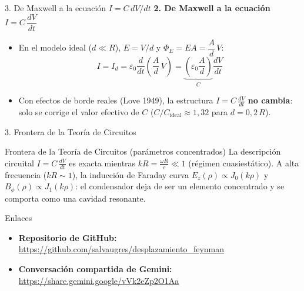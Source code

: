 \documentclass[aspectratio=43, 11pt]{beamer}
\begin{document}
\begin{frame}{3. De Maxwell a la ecuación $I = C\,dV/dt$}
      \textbf{\color{accentblue}2. De Maxwell a la ecuación $I = C\,\dfrac{dV}{dt}$}
      \vspace{0.15cm}
      \begin{itemize}
        \item En el modelo ideal ($d \ll R$), $E = V/d$ y $\Phi_E = E A = \dfrac{A}{d}\,V$:
        \[
          I = I_d = \varepsilon_0 \frac{d}{dt}\!\left(\frac{A}{d}\,V\right) = \underbrace{\left(\varepsilon_0 \frac{A}{d}\right)}_{C} \frac{dV}{dt}
        \]
        \item Con efectos de borde reales (Love 1949), la estructura $I = C\,\frac{dV}{dt}$ \textbf{no cambia}: solo se corrige el valor efectivo de $C$ ($C/C_{\mathrm{ideal}} \approx 1{,}32$ para $d = 0{,}2\,R$).
      \end{itemize}
\end{frame}

\begin{frame}{3. Frontera de la Teoría de Circuitos}
  \begin{block}{Frontera de la Teoría de Circuitos (parámetros concentrados)}
    La descripción circuital $I = C\,\frac{dV}{dt}$ es exacta mientras $kR = \frac{\omega R}{c} \ll 1$ (régimen cuasiestático). A alta frecuencia ($kR \sim 1$), la inducción de Faraday curva $E_z(\rho) \propto J_0(k\rho)$ y $B_\phi(\rho) \propto J_1(k\rho)$: el condensador deja de ser un elemento concentrado y se comporta como una cavidad resonante.
  \end{block}
\end{frame}

\begin{frame}{Enlaces}
  \begin{itemize}
    \item \textbf{Repositorio de GitHub:}\\
      {\small\url{https://github.com/salvaugres/desplazamiento_feynman}}
    \item \textbf{Conversación compartida de Gemini:}\\
      {\small\url{https://share.gemini.google/vVk2eZp2O1Aa}}
  \end{itemize}
\end{frame}
\end{document}
